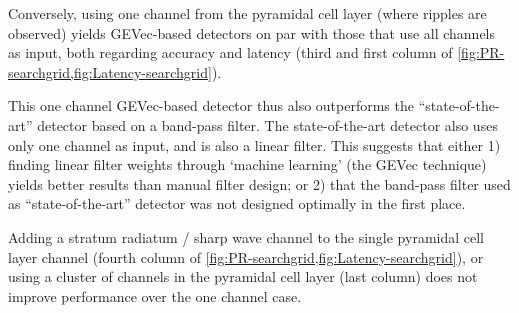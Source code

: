 Conversely, using one channel from the pyramidal cell layer (where ripples are observed) yields GEVec-based detectors on par with those that use all channels as input, both regarding accuracy and latency (third and first column of \cref{fig:PR-searchgrid,fig:Latency-searchgrid}).

This one channel GEVec-based detector thus also outperforms the ``state-of-the-art'' detector based on a band-pass filter. The state-of-the-art detector also uses only one channel as input, and is also a linear filter. This suggests that either 1) finding linear filter weights through `machine learning' (the GEVec technique) yields better results than manual filter design; or 2) that the band-pass filter used as ``state-of-the-art'' detector was not designed optimally in the first place.

Adding a stratum radiatum / sharp wave channel to the single pyramidal cell layer channel (fourth column of \cref{fig:PR-searchgrid,fig:Latency-searchgrid}), or using a cluster of channels in the pyramidal cell layer (last column) does not improve performance over the one channel case.
